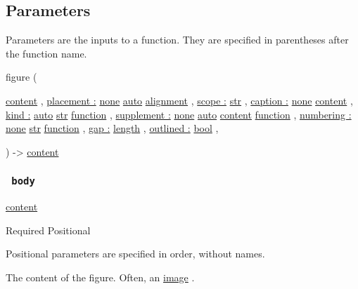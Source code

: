 \subsection{\texorpdfstring{{ Parameters
}}{ Parameters }}\label{parameters}

\label{parameters-tooltip}
Parameters are the inputs to a function. They are specified in
parentheses after the function name.

{ figure } (

{ \href{/docs/reference/foundations/content/}{content} , } {
\hyperref[parameters-placement]{placement :}
\href{/docs/reference/foundations/none/}{none}
\href{/docs/reference/foundations/auto/}{auto}
\href{/docs/reference/layout/alignment/}{alignment} , } {
\hyperref[parameters-scope]{scope :}
\href{/docs/reference/foundations/str/}{str} , } {
\hyperref[parameters-caption]{caption :}
\href{/docs/reference/foundations/none/}{none}
\href{/docs/reference/foundations/content/}{content} , } {
\hyperref[parameters-kind]{kind :}
\href{/docs/reference/foundations/auto/}{auto}
\href{/docs/reference/foundations/str/}{str}
\href{/docs/reference/foundations/function/}{function} , } {
\hyperref[parameters-supplement]{supplement :}
\href{/docs/reference/foundations/none/}{none}
\href{/docs/reference/foundations/auto/}{auto}
\href{/docs/reference/foundations/content/}{content}
\href{/docs/reference/foundations/function/}{function} , } {
\hyperref[parameters-numbering]{numbering :}
\href{/docs/reference/foundations/none/}{none}
\href{/docs/reference/foundations/str/}{str}
\href{/docs/reference/foundations/function/}{function} , } {
\hyperref[parameters-gap]{gap :}
\href{/docs/reference/layout/length/}{length} , } {
\hyperref[parameters-outlined]{outlined :}
\href{/docs/reference/foundations/bool/}{bool} , }

) -\textgreater{} \href{/docs/reference/foundations/content/}{content}

\subsubsection{\texorpdfstring{\texttt{\ body\ }}{ body }}\label{parameters-body}

\href{/docs/reference/foundations/content/}{content}

{Required} {{ Positional }}

\label{parameters-body-positional-tooltip}
Positional parameters are specified in order, without names.

The content of the figure. Often, an
\href{/docs/reference/visualize/image/}{image} .

